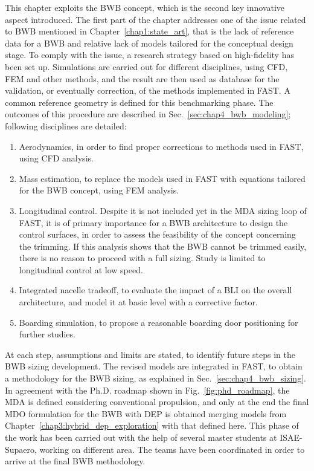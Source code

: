 This chapter exploits the BWB concept, which is the second key innovative aspect introduced.
The first part of the chapter addresses one of the issue related to BWB mentioned in Chapter~\ref{chap1:state_art}, that is the lack of reference data for a BWB and relative lack of models tailored for the conceptual design stage. 
To comply with the issue, a research strategy based on high-fidelity has been set up. 
Simulations are carried out for different disciplines, using CFD, FEM and other methods, and the result are then used as database for the validation, or eventually correction, of the methods implemented in FAST. 
A common reference geometry is defined for this benchmarking phase. 
The outcomes of this procedure are described in Sec.~\ref{sec:chap4_bwb_modeling}; following disciplines are detailed: 
\begin{enumerate}
	\item Aerodynamics, in order to find proper corrections to methods used in FAST, using CFD analysis.
	
	\item Mass estimation, to replace the models used in FAST with equations tailored for the BWB concept, using FEM analysis.  
	
	\item Longitudinal control. Despite it is not included yet in the MDA sizing loop of FAST, it is of primary importance for a BWB architecture to design the control surfaces, in order to assess the feasibility of the concept concerning the trimming. If this analysis shows that the BWB cannot be trimmed easily, there is no reason to proceed with a full sizing. Study is limited to longitudinal control at low speed. 
	
	\item Integrated nacelle tradeoff, to evaluate the impact of a BLI on the overall architecture, and model it at basic level with a corrective factor. 
	
	\item Boarding simulation, to propose a reasonable boarding door positioning for further studies. 
	
\end{enumerate}
At each step, assumptions and limits are stated, to identify future steps in the BWB sizing development. 
The revised models are integrated in FAST, to obtain a methodology for the BWB sizing, as explained in Sec.~\ref{sec:chap4_bwb_sizing}.
In agreement with the Ph.D. roadmap shown in Fig.~\ref{fig:phd_roadmap}, the MDA is defined considering conventional propulsion, and only at the end the final MDO formulation for the BWB with DEP is obtained merging models from Chapter~\ref{chap3:hybrid_dep_exploration} with that defined here. 
This phase of the work has been carried out with the help of several master students at ISAE-Supaero, working on different area. 
The teams have been coordinated in order to arrive at the final BWB methodology. 


